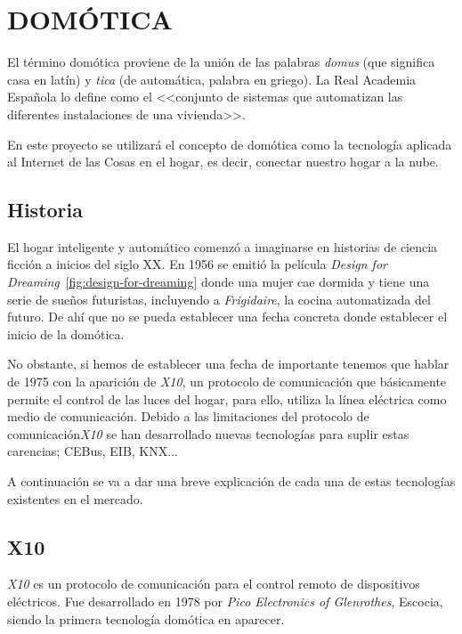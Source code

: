 \section{DOMÓTICA}

El término domótica proviene de la unión de las palabras \emph{domus} (que significa casa en latín) y \emph{tica} (de automática, palabra en griego). La Real Academia Española lo define como el <<conjunto de sistemas que automatizan las diferentes instalaciones de una vivienda>>.

En este proyecto se utilizará el concepto de domótica como la tecnología aplicada al Internet de las Cosas en el hogar, es decir, conectar nuestro hogar a la nube.

\subsection{Historia}


El hogar inteligente y automático comenzó a imaginarse en historias de ciencia ficción a inicios del siglo XX. En 1956 se emitió la película \emph{Design for Dreaming}~\ref{fig:design-for-dreaming} donde una mujer cae dormida y tiene una serie de sueños futuristas, incluyendo a \emph{Frigidaire}, la cocina automatizada del futuro. De ahí que no se pueda establecer una fecha concreta donde establecer el inicio de la domótica.

No obstante, si hemos de establecer una fecha de importante tenemos que hablar de 1975 con la aparición de \emph{X10}, un protocolo de comunicación que básicamente permite el control de las luces del hogar, para ello, utiliza la línea eléctrica como medio de comunicación. Debido a las limitaciones del protocolo de comunicación\emph{X10} se han desarrollado nuevas tecnologías para suplir estas carencias; CEBus, EIB, KNX...

A continuación se va a dar una breve explicación de cada una de estas tecnologías existentes en el mercado.

\subsection{X10}

\emph{X10} es un protocolo de comunicación para el control remoto de dispositivos eléctricos. Fue desarrollado en 1978 por \emph{Pico Electronics of Glenrothes}, Escocia, siendo la primera tecnología domótica en aparecer.

